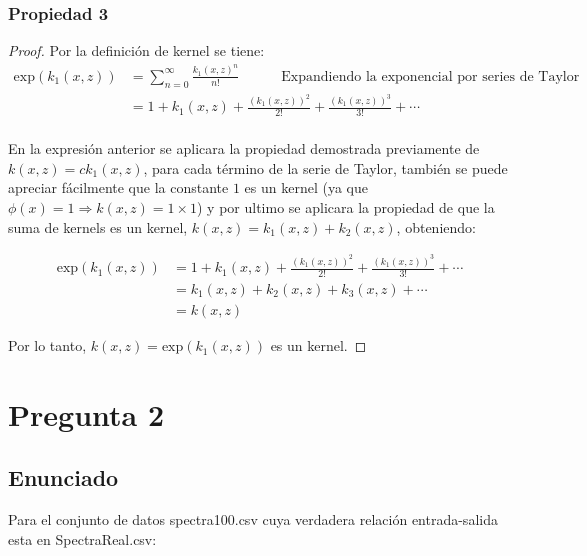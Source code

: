 \documentclass{article}
\theoremstyle{mytheoremstyle}
\theoremstyle{mytheoremstyle}
\theoremstyle{myproblemstyle}
\begin{document}
\subsubsection*{Propiedad 3}

\begin{proof} Por la definición de kernel se tiene:
  \begin{align*}
    \text{exp}(k_1(x, z)) & = \sum_{n=0}^\infty \frac{k_1(x, z)^n}{n!} \qquad \quad \text{Expandiendo la exponencial por series de Taylor} \\
                          & = 1 + k_1(x, z) + \frac{(k_1(x, z))^2}{2!} + \frac{(k_1(x, z))^3}{3!} + \cdots                                 \\
  \end{align*}

  En la expresión anterior se aplicara la propiedad demostrada previamente de $k(x,z) = ck_1(x,z)$, para cada término de la serie de Taylor, también se puede apreciar fácilmente que la constante $1$ es un kernel (ya que $\phi(x) = 1 \Rightarrow k(x,z) = 1\times 1$) y por ultimo se aplicara la propiedad de que la suma de kernels es un kernel, $k(x,z) = k_1(x,z) + k_2(x,z)$, obteniendo:

  \begin{align*}
    \text{exp}(k_1(x, z)) & = 1 + k_1(x, z) + \frac{(k_1(x, z))^2}{2!} + \frac{(k_1(x, z))^3}{3!} + \cdots \\
                          & = k_1(x,z) + k_2(x,z) + k_3(x,z) + \cdots                                      \\
                          & = k(x,z)
  \end{align*}



  Por lo tanto, $k(x, z) = \text{exp}(k_1(x, z))$ es un kernel.

\end{proof}

\section*{Pregunta 2}

\subsection*{Enunciado}

Para el conjunto de datos spectra100.csv cuya verdadera relación entrada-salida esta en SpectraReal.csv:
\end{document}
